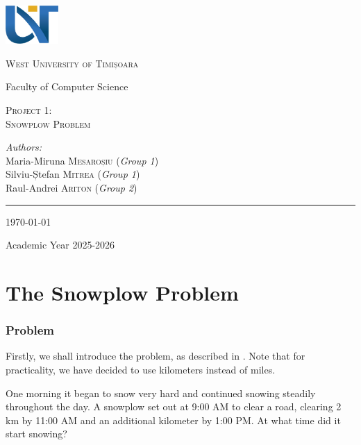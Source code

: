 \documentclass[a4paper,12pt]{article}
\begin{document}
\begin{titlepage}
	\vspace*{-3cm}
	\centering
		\includegraphics[width=2cm]{assets/uvt_logo_en.png}

	{\scshape\LARGE West University of Timișoara\par}

	\vspace{1cm}

	{\large Faculty of Computer Science}

	\vspace{.1\textheight}
	{ \LARGE \scshape Project 1: \\ Snowplow Problem \par}

		\vspace{.1\linewidth}

			{\emph{Authors:} \\
			Maria-Miruna \textsc{Mesaroșiu} (\textit{Group 1}) \\
            Silviu-Ștefan \textsc{Mitrea} (\textit{Group 1}) \\
            Raul-Andrei \textsc{Ariton} (\textit{Group 2})    
            }

			\vfill

			\rule{.4\textwidth}{.4pt}

	{\large \today\par
	Academic Year 2025-2026\par}
\end{titlepage}

\tableofcontents \newpage

\part{The Snowplow Problem} \label{firstpart}
\section{Problem}
    Firstly, we shall introduce the problem, as described in \cite[pp.~84--85]{Kent_Nagle2018-ig}. Note that for practicality, we have decided to use kilometers instead of miles.

    \begin{framed}
        \noindent One morning it began to snow very hard and continued snowing steadily throughout the day. A snowplow set out at 9:00 AM to clear a road, clearing 2 \unit{\kilo\meter} by 11:00 AM and an additional kilometer by 1:00 PM. At what time did it start snowing?
    \end{framed}
    
\end{document}

